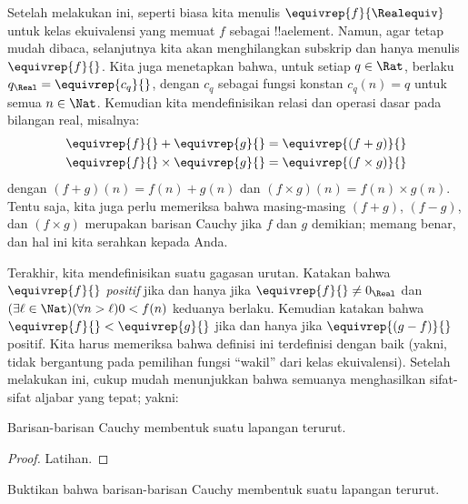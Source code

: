 \documentclass[../../../include/open-logic-section]{subfiles}
\begin{document}
Setelah melakukan ini, seperti biasa kita menulis
$\equivrep{f}{\Realequiv}$ untuk kelas ekuivalensi yang memuat $f$ sebagai
!!a{element}. Namun, agar tetap mudah dibaca, selanjutnya kita akan
menghilangkan subskrip dan hanya menulis $\equivrep{f}{}$. Kita juga
menetapkan bahwa, untuk setiap $q \in \Rat$, berlaku $q_{\Real} =
\equivrep{c_{q}}{}$, dengan $c_{q}$ sebagai fungsi konstan $c_q(n) = q$ untuk
semua $n \in \Nat$. Kemudian kita mendefinisikan relasi dan operasi dasar pada
bilangan real, misalnya:
\begin{align*}
	\equivrep{f}{} + \equivrep{g}{} &= 	\equivrep{(f + g)}{} \\
	\equivrep{f}{} \times 	\equivrep{g}{} &= \equivrep{(f \times g)}{} 
\end{align*}
dengan $(f + g)(n) = f(n) + g(n)$ dan $(f \times g)(n) = f(n) \times
g(n)$. Tentu saja, kita juga perlu memeriksa bahwa masing-masing $(f + g)$,
$(f-g)$, dan $(f\times g)$ merupakan barisan Cauchy jika $f$ dan $g$ demikian;
memang benar, dan hal ini kita serahkan kepada Anda.

Terakhir, kita mendefinisikan suatu gagasan urutan. Katakan bahwa
$\equivrep{f}{}$ \emph{positif} jika dan hanya jika
$\equivrep{f}{}\neq 0_\Real$ dan $(\exists \ell \in \Nat)(\forall n >
\ell)0 < f(n)$ keduanya berlaku. Kemudian katakan bahwa $\equivrep{f}{} <
\equivrep{g}{}$ jika dan hanya jika $\equivrep{(g - f)}{}$ positif. Kita harus
memeriksa bahwa definisi ini terdefinisi dengan baik (yakni, tidak bergantung
pada pemilihan fungsi ``wakil'' dari kelas ekuivalensi).
Setelah melakukan ini, cukup mudah menunjukkan bahwa semuanya menghasilkan
sifat-sifat aljabar yang tepat; yakni:
\begin{thm}
Barisan-barisan Cauchy membentuk suatu lapangan terurut.
\end{thm}

\begin{proof}
Latihan.
\end{proof}

\begin{prob}
Buktikan bahwa barisan-barisan Cauchy membentuk suatu lapangan terurut.
\end{prob}
\end{document}
